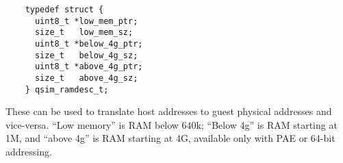 \documentclass[letterpaper, 10pt]{book}
\begin{document}
\begin{verbatim}
    typedef struct {
      uint8_t *low_mem_ptr;
      size_t   low_mem_sz;
      uint8_t *below_4g_ptr;
      size_t   below_4g_sz;
      uint8_t *above_4g_ptr;
      size_t   above_4g_sz;
    } qsim_ramdesc_t;
\end{verbatim}

These can be used to translate host addresses to guest physical addresses and 
vice-versa. ``Low memory'' is RAM below 640k; ``Below 4g'' is RAM starting at
1M, and ``above 4g'' is RAM starting at 4G, available only with PAE or 64-bit
addressing.

\newpage
\end{document}
